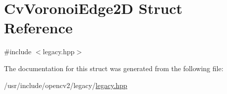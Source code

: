 \hypertarget{structCvVoronoiEdge2D}{\section{Cv\-Voronoi\-Edge2\-D Struct Reference}
\label{structCvVoronoiEdge2D}
}


{\ttfamily \#include $<$legacy.\-hpp$>$}



The documentation for this struct was generated from the following file\-:\begin{DoxyCompactItemize}
\item 
/usr/include/opencv2/legacy/\hyperlink{legacy_8hpp}{legacy.\-hpp}\end{DoxyCompactItemize}
